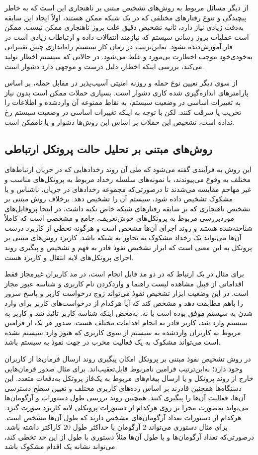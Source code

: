 \documentclass[a4paper,oneside,12pt]{report}
\begin{document}
از دیگر مسائل مربوط به روش‌های تشخیص مبتنی بر ناهنجاری این است که به خاطر پیچیدگی و تنوع رفتارهای مختلفی که در یک شبکه ممکن هستند، اولاً ایجاد این سابقه به‌دقت زیادی نیاز دارد، ثانیه تشخیص دقیق علت بروز ناهنجاری ممکن نیست. ممکن است عملیات بروز رسانی سیستم که نیازمند انتقالات داده و ارتباطات زیادی است در فاز آموزش‌دیده نشود. به‌این‌ترتیب در زمان کار سیستم راه‌اندازی چنین تغییراتی به‌خودی‌خود موجب اخطارت بی‌مورد و غلط می‌شود. در حالاتی که سیستم اخطار تولید می‌کند، بررسی اینکه اخطار، دلیل درست و موجهی دارد دشوار است.

 از سوی دیگر تعیین نوع حمله و روزنه امنیتی آسیب‌پذیر در مقابل حمله، بر اساس پارامترهای اندازه‌گیری شده کاری دشوار است. بسیاری حملات ممکن است بدون نیاز به تغییرات اساسی در وضعیت سیستم، به نقاط ممنوعه آن واردشده و اطلاعات را تخریب یا سرقت کنند. لکن با توجه به اینکه تغییرات اساسی در وضعیت سیستم رخ نداده است، تشخیص این حملات بر اساس این روش‌ها دشوار و یا ناممکن است.
 \subsection{روش‌های مبتنی بر تحلیل حالت پروتکل ارتباطی} 
 این روش به فرآیندی گفته می‌شود که طی آن روند رخدادهایی که در جریان ارتباط‌های مختلف به وقوع می‌پیوندند، با نمونه‌های سلسله رخداد مربوط به پروتکل‌های مناسب و غیر مهاجم مقایسه می‌شدند تا درصورتی‌که مجموعه رخدادهای در جریان، ناشناس و یا مشکوک تشخیص داده شود، سیستم آن را تشخیص دهد. برخلاف روش مبتنی بر تشخیص ناهنجاری که بر سابقه رفتارهای شبکه خاص تکیه داشت، در اینجا پروفایل‌های موردبررسی مربوط به پروتکل‌های خوش‌تعریف، جامع و مشخصی است که کاملاً شناخته‌شده هستند و روند اجرای آن‌ها مشخص است و هرگونه تخطی از کاربرد درست آن‌ها می‌تواند یک رخداد مشکوک به تجاوز به شبکه باشد. کاربرد روش‌های مبتنی بر پروتکل به این معنی است که ابزار تشخیص نفوذ قادر به فهم و تشخیص و پیگیری روند اجرای پروتکل‌های لایه انتقال و کاربرد هست.
 
برای مثال در یک ارتباط 
که در دو مد قابل انجام است، در مد کاربران غیرمجاز فقط اقداماتی از قبیل مشاهده لیست راهنما و واردکردن نام کاربری و شناسه عبور مجاز است. در این وضعیت ابزار تشخیص نفوذ می‌تواند زوج درخواست کاربر و پاسخ سرور را باهم مطابقت دهد و مشخص کند که آیا هرکدام از درخواست‌های کاربر برای وارد شدن به سیستم موفق بوده است یا نه. به‌محض اینکه شناسه کاربر تائید شد و کاربر به سیستم وارد شد، کاربر قادر به انجام اقدامات مختلف هست. صدور هر یک از فرامین مربوط به کاربران واردشده به سیستم از سوی کاربری که هنوز وارد سیستم نشده است می‌تواند مشکوک به یک فعالیت مخرب در جهت نفوذ به سیستم باشد.

 در روش تشخیص نفوذ مبتنی بر پروتکل امکان پیگیری روند ارسال فرمان‌ها از کاربران وجود دارد؛ به‌این‌ترتیب فرامین نامربوط قابل‌تعقیب‌اند. برای مثال صدور فرمان‌هایی خارج از روند پروتکل و یا ارسال پیغام‌های مربوط به یک‌فاز پروتکل به‌دفعات متعدد. این دستگاه‌ها همچنین قادرند بر اساس رده‌های کاربری مختلف و تعیین سطح دسترسی آن‌ها، فعالیت آن‌ها را پیگیری کنند. همچنین روند بررسی طول دستورات و آرگومان‌ها می‌تواند به‌صورت مجزا بر روی هرکدام از دستورات پروتکلی لایه کاربرد صورت گیرد. هرکدام از دستورات تعداد آرگومان‌های مشخص دارند که طول آن‌ها مشخص است. برای مثال دستوری می‌تواند 
 $2$ 
 آرگومان با حداکثر طول 
 $20$
 کاراکتر داشته باشد. درصورتی‌که تعداد آرگومان‌ها و یا طول آن‌ها مثلاً دستوری با طول از این حد تخطی کند، می‌تواند نشانه یک اقدام مشکوک باشد.
 
\end{document}
